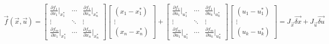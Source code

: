 \begin{align*}
    \vec{f}(\vec{x}, \vec{u}) = \begin{bmatrix}
        \frac{\partial f_1}{\partial x_1} \bigg\rvert_{x_1^*} & \cdots & \frac{\partial f_1}{\partial x_n} \bigg\rvert_{x_n^*} \\
        \vdots & \ddots & \vdots \\
        \frac{\partial f_m}{\partial x_1} \bigg\rvert_{x_1^*} & \cdots & \frac{\partial f_m}{\partial x_n} \bigg\rvert_{x_n^*}
    \end{bmatrix} \begin{bmatrix}
        (x_1 - x_1^*) \\
        \vdots \\
        (x_n - x_n^*)
    \end{bmatrix} + \begin{bmatrix}
        \frac{\partial f_1}{\partial u_1} \bigg\rvert_{u_1^*} & \cdots & \frac{\partial f_1}{\partial u_k} \bigg\rvert_{u_k^*} \\
        \vdots & \ddots & \vdots \\
        \frac{\partial f_m}{\partial u_1} \bigg\rvert_{u_1^*} & \cdots & \frac{\partial f_m}{\partial u_k} \bigg\rvert_{u_k^*}
    \end{bmatrix} \begin{bmatrix}
        (u_1 - u_1^*) \\
        \vdots \\
        (u_k - u_k^*)
    \end{bmatrix} = J_{\vec{x}} \vec{\delta x} + J_{\vec{u}} \vec{\delta u}
\end{align*}

